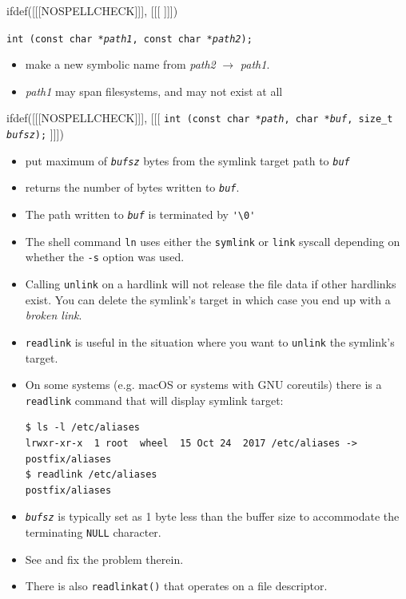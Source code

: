 
ifdef([[[NOSPELLCHECK]]], [[[
]]])

\begin{slide}
\texttt{int (const char *\emph{path1},
const char *\emph{path2});}
\begin{itemize}
\item make a new symbolic name from \emph{path2} $\rightarrow$ \emph{path1}.
\item \emph{path1} may span filesystems, and may not exist at all
\end{itemize}
ifdef([[[NOSPELLCHECK]]], [[[
\texttt{int (const char *\emph{path}, char *\emph{buf},
size\_t \emph{bufsz});}
]]])
\begin{itemize}
\item put maximum of \emph{\texttt{bufsz}} bytes from the symlink target path
to \texttt{\emph{buf}}
\item returns the number of bytes written to \texttt{\emph{buf}}.
\item The path written to \texttt{\emph{buf}} is  terminated
by \verb#'\0'#
\end{itemize}
\end{slide}

\begin{itemize}
\item The shell command \texttt{ln} uses either the \texttt{symlink} or
\texttt{link} syscall depending on whether the \texttt{-s} option was used.
\item Calling \texttt{unlink} on a hardlink will not release the file data if
other hardlinks exist. You can delete the symlink's target in which case you
end up with a \emph{broken link}.
\item \texttt{readlink} is useful in the situation where you want to
\texttt{unlink} the symlink's target.
\item On some systems (e.g. macOS or systems with GNU coreutils)
there is a \texttt{readlink} command that will display symlink target:
\begin{verbatim}
$ ls -l /etc/aliases
lrwxr-xr-x  1 root  wheel  15 Oct 24  2017 /etc/aliases -> postfix/aliases
$ readlink /etc/aliases
postfix/aliases
\end{verbatim}
\item \emph{\texttt{bufsz}} is typically set as 1 byte less than the buffer
size to accommodate the terminating \texttt{NULL} character.
\item See  and fix the problem therein.
\item There is also \texttt{readlinkat()} that operates on a file descriptor.
\end{itemize}

